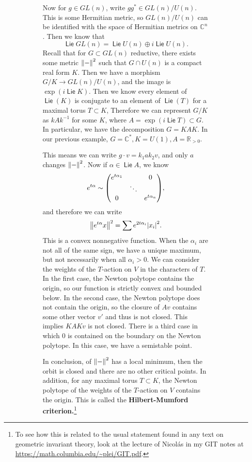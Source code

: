 \documentclass[leqno, openany]{memoir}
\theoremstyle{definition}
\theoremstyle{remark}
\theoremstyle{plain}
\theoremstyle{definition}
\theoremstyle{remark}
\newcommand{\R}{\mathbb{R}}
\newcommand{\C}{\mathbb{C}}
\DeclareMathOperator{\Lie}{\mathsf{Lie}}
\begin{document}
\begin{figure}[H]
\begin{figure}[H]
Now for $g \in GL(n)$, write $gg^* \in GL(n)/U(n)$. This is some Hermitian
metric, so $GL(n)/U(n)$ can be identified with the space of Hermitian metrics
on $\C^n$. Then we know that \[ \Lie GL(n) = \Lie U(n) \oplus i \Lie U(n). \]
Recall that for $G \subset GL(n)$ reductive, there exists some metric
$\norm{-}^2$ such that $G \cap U(n)$ is a compact real form $K$. Then we have a
morphism $G/K \to GL(n) / U(n)$, and the image is $\exp (i \Lie K)$. Then we
know every element of $\Lie(K)$ is conjugate to an element of $\Lie(T)$ for a
maximal torus $T \subset K$, Therefore we can represent $G/K$ as $kAk^{-1}$ for
some $K$, where $A = \exp(i \Lie T) \subset G$. In particular, we have the
decomposition $G = KAK$. In our previous example, $G = \C^*, K = U(1), A =
\R_{>0}$.

This means we can write $g \cdot v = k_1 a k_2 v$, and only $a$ changes
$\norm{-}^2$. Now if $\alpha \in \Lie A$, we know \[ e^{t \alpha} \sim \mqty(
e^{t \alpha_1} & & 0 \\ & \ddots & \\ 0 & & e^{t \alpha_n} ), \] and therefore
we can write \[ \norm{e^{t \alpha} x}^2 = \sum e^{2 t \alpha_i} \abs{x_i}^2. \]
This is a convex nonnegative function. When the $\alpha_i$ are not all of the
same sign, we have a unique maximum, but not necessarily when all $\alpha_i >
0$. We can consider the weights of the $T$-action on $V$ in the characters of
$T$. In the first case, the Newton polytope contains the origin, so our
function is strictly convex and bounded below. In the second case, the Newton
polytope does not contain the origin, so the closure of $Av$ contains some
other vector $v'$ and thus is not closed. This implies $KAKv$ is not closed.
There is a third case in which $0$ is contained on the boundary on the Newton
polytope. In this case, we have a semistable point.

In conclusion, of $\norm{-}^2$ has a local minimum, then the orbit is closed
and there are no other critical points. In addition, for any maximal torus $T
\subset K$, the Newton polytope of the weights of the $T$-action on $V$
contains the origin. This is called the \textbf{Hilbert-Mumford
criterion.}\footnote{To see how this is related to the usual statement found in
any text on geometric invariant theory, look at the lecture of Nicol\'as in my
GIT notes at \url{https://math.columbia.edu/~plei/GIT.pdf}.} 


\end{figure}
\end{figure}
\end{document}
